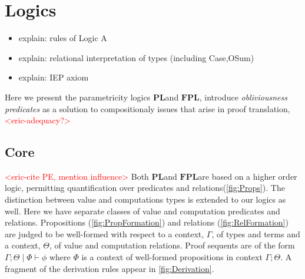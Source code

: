 \documentclass[acmsmall]{acmart}
\newcommand{\eric}[1]{\textcolor{red}{ <eric-#1> }}
\newcommand{\pl}{$\mathbf{PL}$}
\newcommand{\fpl}{$\mathbf{FPL}$}
\begin{document}
\section{Logics}\label{sec:Logics}
\begin{itemize}
  \item explain: rules of Logic A
  \item explain: relational interpretation of types (including Case,OSum)
  \item explain: IEP axiom
\end{itemize}
Here we present the parametricity logics \pl\;and \fpl, introduce \textit{obliviousness predicates} as a solution to compositionaly issues that arise in proof translation, \eric{adequacy?}

\subsection{Core}
\eric{cite PE, mention influence}
Both \pl\;and \fpl\;are based on a higher order logic, permitting quantification over predicates and relations(\cref{fig:Props}). The distinction between value and computations types is extended to our logics as well. Here we have separate classes of value and computation predicates and relations. Propositions (\cref{fig:PropFormation}) and relations (\cref{fig:RelFormation}) are judged to be well-formed with respect to a context, $\Gamma$, of types and terms and a context, $\Theta$, of value and computation relations.  Proof sequents are of the form $\Gamma ; \Theta \;|\; \Phi \vdash \phi$ where $\Phi$ is a context of well-formed propositions in context $\Gamma; \Theta$. A fragment of the derivation rules appear in \cref{fig:Derivation}. 
\end{document}
